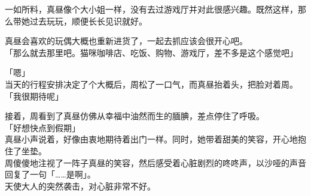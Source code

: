 一如所料，真昼像个大小姐一样，没有去过游戏厅并对此很感兴趣。既然这样，那么带她过去玩玩，顺便长长见识就好。

真昼会喜欢的玩偶大概也重新进货了，一起去抓应该会很开心吧。\\

「那么就去那里吧。猫咪咖啡店、吃饭、购物、游戏厅，差不多是这个感觉吧」

「嗯」\\

当天的行程安排决定了个大概后，周松了一口气，而真昼抬着头，把脸对着周。\\

「我很期待呢」

接着，周看到了真昼仿佛从幸福中油然而生的腼腆，差点停住了呼吸。\\

「好想快点到假期」\\

真昼小声说着，好像由衷地期待着出门一样。同时，她带着甜美的笑容，开心地抱住了坐垫。\\

周傻傻地注视了一阵子真昼的笑容，然后感受着心脏剧烈的咚咚声，以沙哑的声音回复了一句「……是啊」。\\

天使大人的突然袭击，对心脏非常不好。
